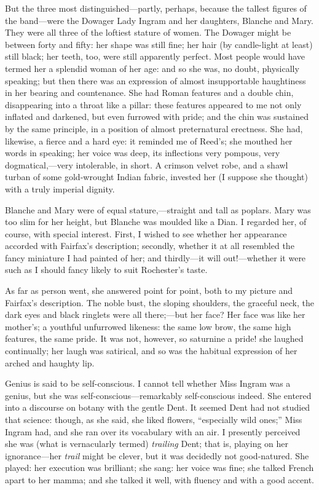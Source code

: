 But the three most distinguished---partly, perhaps, because the tallest
figures of the band---were the Dowager Lady Ingram and her daughters,
Blanche and Mary. They were all three of the loftiest stature of
women. The Dowager might be between forty and fifty: her shape was
still fine; her hair (by candle-light at least) still black; her teeth,
too, were still apparently perfect. Most people would have termed her a
splendid woman of her age: and so she was, no doubt, physically
speaking; but then there was an expression of almost insupportable
haughtiness in her bearing and countenance. She had Roman features and
a double chin, disappearing into a throat like a pillar: these features
appeared to me not only inflated and darkened, but even furrowed with
pride; and the chin was sustained by the same principle, in a position
of almost preternatural erectness. She had, likewise, a fierce and a
hard eye: it reminded me of \Mrs{} Reed's; she mouthed her words in
speaking; her voice was deep, its inflections very pompous, very
dogmatical,---very intolerable, in short. A crimson velvet robe, and a
shawl turban of some gold-wrought Indian fabric, invested her (I suppose
she thought) with a truly imperial dignity.

Blanche and Mary were of equal stature,---straight and tall as poplars.
Mary was too slim for her height, but Blanche was moulded like a Dian.
I regarded her, of course, with special interest. First, I wished to
see whether her appearance accorded with \Mrs{} Fairfax's description;
secondly, whether it at all resembled the fancy miniature I had painted
of her; and thirdly---it will out!---whether it were such as I should
fancy likely to suit \Mr{} Rochester's taste.

As far as person went, she answered point for point, both to my picture
and \Mrs{} Fairfax's description. The noble bust, the sloping shoulders,
the graceful neck, the dark eyes and black ringlets were all
there;---but her face? Her face was like her mother's; a youthful
unfurrowed likeness: the same low brow, the same high features, the same
pride. It was not, however, so saturnine a pride! she laughed
continually; her laugh was satirical, and so was the habitual expression
of her arched and haughty lip.

Genius is said to be self-conscious. I cannot tell whether Miss Ingram
was a genius, but she was self-conscious---remarkably self-conscious
indeed. She entered into a discourse on botany with the gentle \Mrs{}
Dent. It seemed \Mrs{} Dent had not studied that science: though, as she
said, she liked flowers, \enquote{especially wild ones;} Miss Ingram
had, and she ran over its vocabulary with an air. I presently perceived
she was (what is vernacularly termed) \emph{trailing} \Mrs{} Dent; that
is, playing on her ignorance---her \emph{trail} might be clever, but it
was decidedly not good-natured. She played: her execution was
brilliant; she sang: her voice was fine; she talked French apart to her
mamma; and she talked it well, with fluency and with a good accent.

